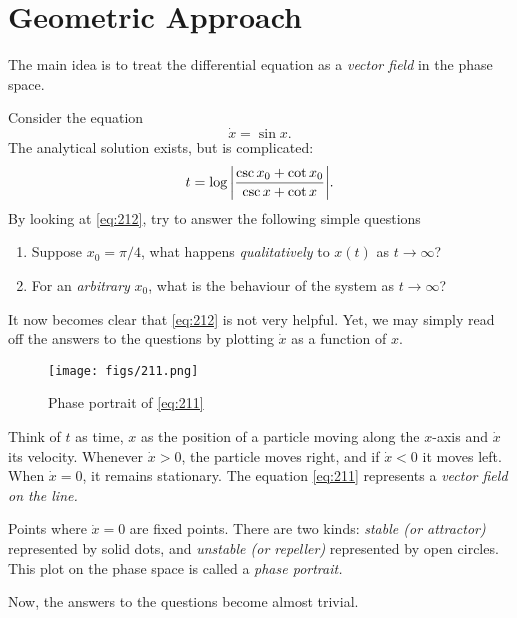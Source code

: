 \documentclass[oneside]{book}
\begin{document}
\section{Geometric Approach}
The main idea is to treat the differential equation as a \textit{vector field} in the phase space.
\par
Consider the equation
\begin{equation} \label{eq:211}
\dot{x} = \sin x.
\end{equation}
The analytical solution exists, but is complicated:
\begin{equation} \label{eq:212}
	t = \log \abs{\frac{\csc x_0 + \cot x_0}{\csc x + \cot x}}.
\end{equation}
By looking at \eqref{eq:212}, try to answer the following simple questions
\begin{enumerate}
	\item Suppose $ x_0  = \pi / 4$, what happens \textit{qualitatively}  to $ x(t) $ as $ t \to \infty $?
	\item For an \textit{arbitrary} $ x_0 $, what is the behaviour of the system as $ t \to \infty $?
\end{enumerate}
It now becomes clear that \eqref{eq:212} is not very helpful. Yet, we may simply read off the answers to the questions by plotting $ \dot{x} $ as a function of $ x $.
\begin{figure}[h]
	\centering
	\texttt{[image: figs/211.png]}
	\caption{Phase portrait of \eqref{eq:211}}
\end{figure}
\par
Think of $ t $ as time, $ x $ as the position of a particle moving along the $ x $-axis and $ \dot{x} $ its velocity. Whenever $ \dot{x} > 0 $, the particle moves right, and if $ \dot{x} < 0 $ it moves left. When $ \dot{x} = 0 $, it remains stationary. The equation \eqref{eq:211} represents a \textit{vector field on the line.}
\par
Points where $ \dot{x} = 0 $ are fixed points. There are two kinds: \textit{stable (or attractor)} represented by solid dots, and \textit{unstable (or repeller)} represented by open circles. This plot on the phase space is called a \textit{phase portrait.}
\par
Now, the answers to the questions become almost trivial.
\end{document}
